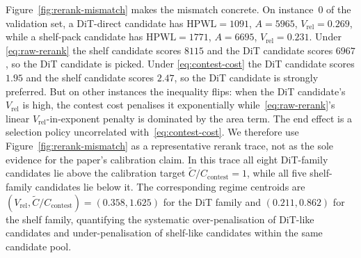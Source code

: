 \documentclass[nolineno]{ieeeaccess}
\begin{document}
Figure~\ref{fig:rerank-mismatch} makes the mismatch concrete. On
instance~0 of the validation set, a DiT-direct candidate has
$\text{HPWL}=1091$, $A=5965$, $V_{\text{rel}}=0.269$, while a shelf-pack
candidate has $\text{HPWL}=1771$, $A=6695$, $V_{\text{rel}}=0.231$. Under
\eqref{eq:raw-rerank} the shelf candidate scores $8115$ and the DiT
candidate scores $6967$, so the DiT candidate is picked. Under
\eqref{eq:contest-cost} the DiT candidate scores $1.95$ and the shelf
candidate scores $2.47$, so the DiT candidate is strongly preferred.
But on other instances the inequality flips: when the DiT candidate's
$V_{\text{rel}}$ is high, the contest cost penalises it exponentially
while~\eqref{eq:raw-rerank}'s linear $V_{\text{rel}}$-in-exponent penalty
is dominated by the area term. The end effect is a selection policy
uncorrelated with~\eqref{eq:contest-cost}. We therefore use
Figure~\ref{fig:rerank-mismatch} as a representative rerank trace,
not as the sole evidence for the paper's calibration claim. In this
trace all eight DiT-family candidates lie above the calibration target
$\widetilde{C}/C_{\text{contest}}=1$, while all five shelf-family
candidates lie below it. The corresponding regime centroids are
$(V_{\text{rel}}, \widetilde{C}/C_{\text{contest}}) =
(0.358, 1.625)$ for the DiT family and $(0.211, 0.862)$ for the
shelf family, quantifying the systematic over-penalisation of DiT-like
candidates and under-penalisation of shelf-like candidates within the
same candidate pool.
\end{document}
